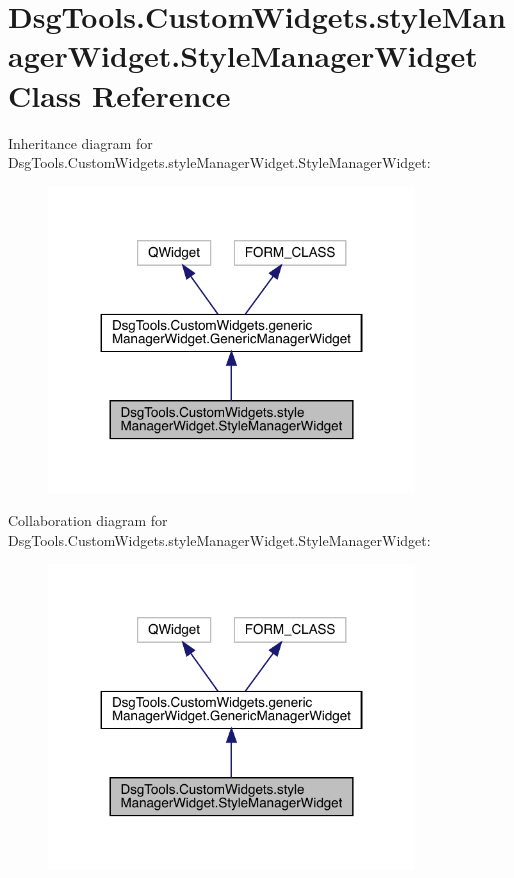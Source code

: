 \hypertarget{class_dsg_tools_1_1_custom_widgets_1_1style_manager_widget_1_1_style_manager_widget}{}\section{Dsg\+Tools.\+Custom\+Widgets.\+style\+Manager\+Widget.\+Style\+Manager\+Widget Class Reference}
\label{class_dsg_tools_1_1_custom_widgets_1_1style_manager_widget_1_1_style_manager_widget}


Inheritance diagram for Dsg\+Tools.\+Custom\+Widgets.\+style\+Manager\+Widget.\+Style\+Manager\+Widget\+:
\nopagebreak
\begin{figure}[H]
\begin{center}
\leavevmode
\includegraphics[width=275pt]{class_dsg_tools_1_1_custom_widgets_1_1style_manager_widget_1_1_style_manager_widget__inherit__graph}
\end{center}
\end{figure}


Collaboration diagram for Dsg\+Tools.\+Custom\+Widgets.\+style\+Manager\+Widget.\+Style\+Manager\+Widget\+:
\nopagebreak
\begin{figure}[H]
\begin{center}
\leavevmode
\includegraphics[width=275pt]{class_dsg_tools_1_1_custom_widgets_1_1style_manager_widget_1_1_style_manager_widget__coll__graph}
\end{center}
\end{figure}
